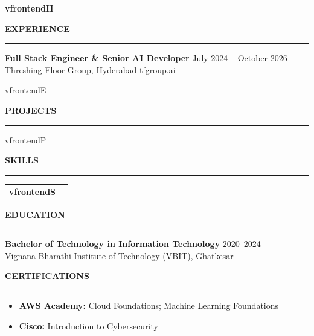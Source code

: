 \documentclass{resume}
\renewenvironment{rSection}[1]{
    \vspace{8pt}
    \noindent
    {\bfseries\MakeUppercase{#1}}
    \par
    \vspace{-3.5pt}
    \noindent\rule{\textwidth}{0.4pt}
    \par
    \vspace{4pt}
}{
    \vspace{3pt}
}
\def\Variant{frontend}
\newcommand{\Headline}{\csname v\Variant H\endcsname}
\newcommand{\ExpList}{\csname v\Variant E\endcsname}
\newcommand{\ProjList}{\csname v\Variant P\endcsname}
\newcommand{\SkillOrder}{\csname v\Variant S\endcsname}
\begin{document}
\sloppy

\begin{center}\large\textbf{\Headline}\end{center}

\begin{rSection}{Experience}
\textbf{Full Stack Engineer \& Senior AI Developer} \hfill July 2024 -- October 2026 \\
Threshing Floor Group, Hyderabad \hfill \href{https://tfgroup.ai/en}{tfgroup.ai}
\begin{itemize}
\ExpList
\end{itemize}
\end{rSection}

\begin{rSection}{Projects}
\begin{itemize}
\ProjList
\end{itemize}
\end{rSection}

\begin{rSection}{Skills}
\begin{tabularx}{\textwidth}{@{}>{\bfseries}p{1.6in}X@{}}
\SkillOrder
\end{tabularx}
\end{rSection}

\begin{rSection}{Education}
\textbf{Bachelor of Technology in Information Technology} \hfill 2020--2024 \\
Vignana Bharathi Institute of Technology (VBIT), Ghatkesar
\end{rSection}

\begin{rSection}{Certifications}
\begin{itemize}
\item \textbf{AWS Academy:} Cloud Foundations; Machine Learning Foundations
\item \textbf{Cisco:} Introduction to Cybersecurity
\end{itemize}
\end{rSection}
\end{document}
